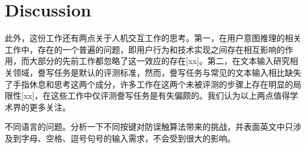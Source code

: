 \section{Discussion}

此外，这份工作还有两点关于人机交互工作的思考。第一，在用户意图推理的相关工作中，存在的一个普遍的问题，即用户行为和技术实现之间存在相互影响的作用，而大部分的先前工作都忽略了这一效应的存在[xx]。第二，在文本输入研究相关领域，誊写任务是默认的评测标准，然而，誊写任务与常见的文本输入相比缺失了手指休息和思考这两个成分，许多工作在这两个未被评测的步骤上存在明显的局限性[xx]，在这些工作中仅评测誊写任务是有失偏颇的。我们认为以上两点值得学术界的更多关注。

不同语言的问题。分析一下不同按键对防误触算法带来的挑战，并表面英文中只涉及到字母、空格、逗号句号的输入需求，不会受到很大的影响。
